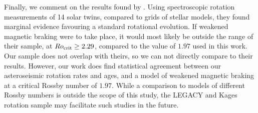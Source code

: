\documentclass[12pt]{article}
\begin{document}
Finally, we comment on the results found by \cite{lorenzo-oliveira+2019}. Using spectroscopic rotation measurements of 14 solar twins, compared to grids of stellar models, they found marginal evidence favouring a standard rotational evolution. If weakened magnetic braking were to take place, it would most likely be outside the range of their sample, at $Ro_{\rm {crit}} \geq 2.29$, compared to the value of $1.97$ used in this work. Our sample does not overlap with theirs, so we can not directly compare to their results. However, our work does find statistical agreement between our asteroseismic rotation rates and ages, and a model of weakened magnetic braking at a critical Rossby number of $1.97$. While a comparison to models of different Rossby numbers is outside the scope of this study, the LEGACY and Kages rotation sample may facilitate such studies in the future.


%
\end{document}
